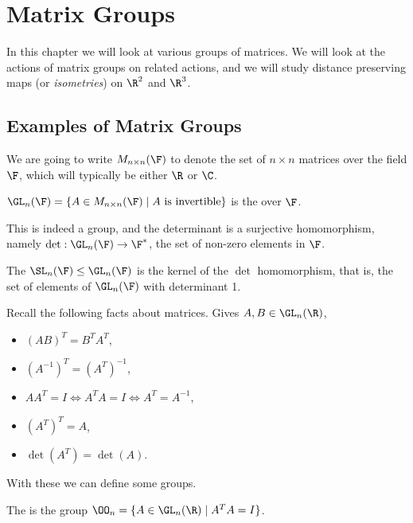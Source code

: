 \documentclass[a4]{scrreprt}
\begin{document}
\chapter{Matrix Groups}

In this chapter we will look at various groups of matrices. We will look at the actions of matrix groups on related actions, and we will study distance preserving maps (or \emph{isometries}) on $\R^2$ and $\R^3$.

\section{Examples of Matrix Groups}

We are going to write $M_{n \times n}(\F)$ to denote the set of $n \times n$ matrices over the field $\F$, which will typically be either $\R$ or $\C$.

\begin{definition}
	$\GL_n(\F) = \{A \in M_{n \times n}(\F) \mid A \text{ is invertible}\}$
 is the  over $\F$.
\end{definition}

This is indeed a group, and the determinant is a surjective homomorphism, namely $\det : \GL_n(\F) \rightarrow \F^*$, the set of non-zero elements in $\F$.

\begin{definition}
	The  $\SL_n(\F) \leq \GL_n(\F)$ is the kernel of the $\det$ homomorphism, that is, the set of elements of $\GL_n(\F)$ with determinant 1.
\end{definition}

Recall the following facts about matrices. Gives $A, B \in \GL_n(\R)$,
\begin{itemize}
	\item $(AB)^T = B^T A^T$,
	\item $(A^{-1})^T = (A^T)^{-1}$,
	\item $AA^{T} = I \iff A^{T} A = I \iff A^T = A^{-1}$,
	\item $(A^T)^T = A$,
	\item $\det(A^T) = \det(A)$.
\end{itemize}
With these we can define some groups.

\begin{definition}
	The  is the group $\OO_n = \{A \in \GL_n(\R) \mid A^T A = I\}$.
\end{definition}
\end{document}
